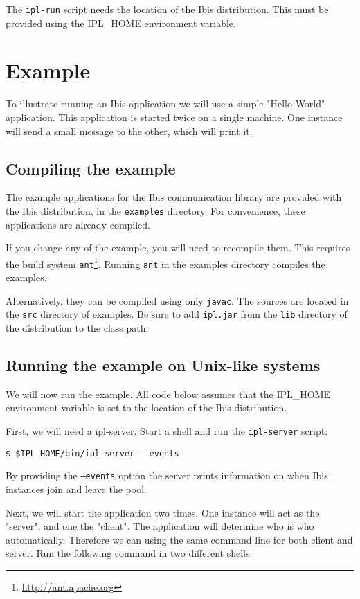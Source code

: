 \documentclass[a4paper,10pt]{article}
\begin{document}
The \texttt{ipl-run} script needs the location of the Ibis
distribution. This must be provided using the IPL\_HOME environment
variable.

\section{Example}

To illustrate running an Ibis application we will use a simple "Hello
World" application. This application is started twice on a single
machine. One instance will send a small message to the other, which will
print it.

\subsection{Compiling the example}

The example applications for the Ibis communication library are
provided with the Ibis distribution, in the \texttt{examples} directory.
For convenience, these applications are already compiled. 

If you change any of the example, you will need to recompile them. This 
requires the build system \texttt{ant}\footnote{\url{http://ant.apache.org}}. 
Running \texttt{ant} in the examples directory compiles the examples.

Alternatively, they can be compiled using only \texttt{javac}. The sources are
located in the \texttt{src} directory of examples. Be sure to add
\texttt{ipl.jar} 
from the \texttt{lib} directory of the distribution to the class path.

\subsection{Running the example on Unix-like systems}

We will now run the example. All code below assumes that the IPL\_HOME
environment variable is set to the location of the Ibis distribution.

First, we will need a ipl-server. Start a shell and
run the \texttt{ipl-server} script:
\noindent
{\small
\begin{verbatim}
$ $IPL_HOME/bin/ipl-server --events
\end{verbatim}
}
\noindent

By providing the \texttt{--events} option the server 
prints information on when Ibis instances join and leave the pool.

Next, we will start the application two times. One instance will act as the
"server", and one the "client". The application will determine who is who
automatically. Therefore we can using the same command line for both client 
and server. Run the following command in two different shells:
\end{document}
